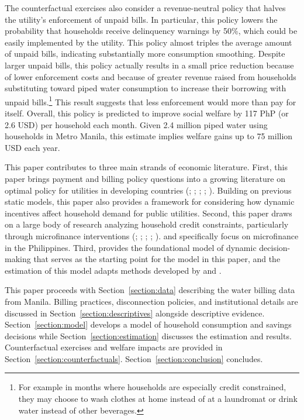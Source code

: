 \documentclass[12pt,table]{article}
\begin{document}
The counterfactual exercises also consider a revenue-neutral policy that halves the utility's enforcement of unpaid bills.  In particular, this policy lowers the probability that households receive delinquency warnings by 50\%, which could be easily implemented by the utility.  This policy almost triples the average amount of unpaid bills, indicating substantially more consumption smoothing.  Despite larger unpaid bills, this policy actually results in a small price reduction because of lower enforcement costs and because of greater revenue raised from households substituting toward piped water consumption to increase their borrowing with unpaid bills.\footnote{For example in months where households are especially credit constrained, they may choose to wash clothes at home instead of at a laundromat or drink water instead of other beverages.}  This result suggests that less enforcement would more than pay for itself.  Overall, this policy is predicted to improve social welfare by 117 PhP (or 2.6 USD) per household each month.  Given 2.4 million piped water using households in Metro Manila, this estimate implies welfare gains up to 75 million USD each year.

This paper contributes to three main strands of economic literature.  First, this paper brings payment and billing policy questions into a growing literature on optimal policy for utilities in developing countries (\cite{mcrae2015infrastructure}; \cite{szabo2015value}; \cite{jack2020charging}; \cite{jack2015pay}; \cite{szabo2015reducing}).  Building on previous static models, this paper also provides a framework for considering how dynamic incentives affect household demand for public utilities.  Second, this paper draws on a large body of research analyzing household credit constraints, particularly through microfinance interventions (\cite{morduch1999microfinance}; \cite{morduch1995income}; \cite{cull2009microfinance}; \cite{dupas2013savings}; \cite{jack2016borrowing}).  \cite{karlan2009expanding} and \cite{gine2014group} specifically focus on microfinance in the Philippines. Third, \cite{deaton1991saving} provides the foundational model of dynamic decision-making that serves as the starting point for the model in this paper, and the estimation of this model adapts methods developed by \cite{gourinchas2002consumption} and \cite{laibson2007estimating}.

This paper proceeds with Section~\ref{section:data} describing the water billing data from Manila.  Billing practices, disconnection policies, and institutional details are discussed in Section~\ref{section:descriptives} alongside descriptive evidence.  Section~\ref{section:model} develops a model of household consumption and savings decisions while Section~\ref{section:estimation} discusses the estimation and results.  Counterfactual exercises and welfare impacts are provided in Section~\ref{section:counterfactuals}.  Section~\ref{section:conclusion} concludes. 
\end{document}
